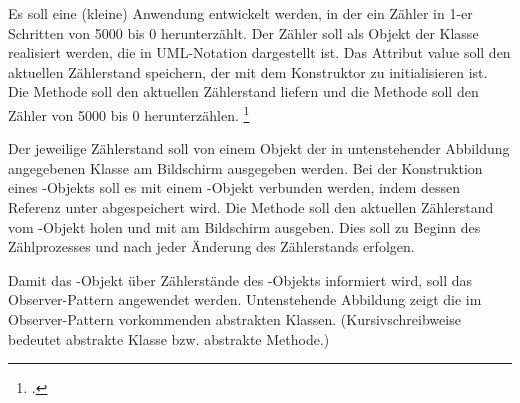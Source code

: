 \documentclass{lehramt-informatik-aufgabe}
\begin{document}

Es soll eine (kleine) Anwendung entwickelt werden, in der ein Zähler in
1-er Schritten von 5000 bis 0 herunterzählt. Der Zähler soll als Objekt
der Klasse  realisiert werden, die in UML-Notation
dargestellt ist. Das Attribut value soll den aktuellen Zählerstand
speichern, der mit dem Konstruktor zu initialisieren ist. Die Methode
 soll den aktuellen Zählerstand liefern und die Methode
 soll den Zähler von 5000 bis 0 herunterzählen.
\footcite{examen:66116:2018:03}

Der jeweilige Zählerstand soll von einem Objekt der in untenstehender
Abbildung angegebenen Klasse  am Bildschirm ausgegeben
werden. Bei der Konstruktion eines -Objekts soll es mit
einem -Objekt verbunden werden, indem dessen Referenz
unter  abgespeichert wird. Die Methode 
soll den aktuellen Zählerstand vom -Objekt holen und mit
 am Bildschirm ausgeben. Dies soll zu Beginn
des Zählprozesses und nach jeder Änderung des Zählerstands erfolgen.

\begin{center}
\end{center}

\noindent
Damit das -Objekt über Zählerstände des
-Objekts informiert wird, soll das Observer-Pattern
angewendet werden. Untenstehende Abbildung zeigt die im Observer-Pattern
vorkommenden abstrakten Klassen. (Kursivschreibweise bedeutet abstrakte
Klasse bzw. abstrakte Methode.)
\end{document}
